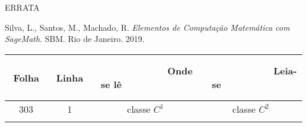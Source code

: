 \documentclass[12pt,a4paper]{report}
\begin{document}
\thispagestyle{empty}










\begin{center}
ERRATA 
\end{center}

\noindent
Silva, L., Santos, M., Machado, R. \textit{Elementos de Computação Matemática com SageMath}. SBM. Rio de Janeiro. 2019.



\vspace{1cm}

\centering
\setlength{\extrarowheight}{1.5pt}
\begin{tabular}{|c|c|c|c|}
\hline
 ~~ Folha ~~ & ~~ Linha ~~ & ~~~~~~~~~~~~ Onde se lê ~~~~~~~~~~~~ & ~~~~~~~~~~~~ Leia-se ~~~~~~~~~~~~ \\
\hline \hline
 303 & 1 & classe $C^1$  & classe $C^2$ \\ \hline
 & & & \\ \hline
\end{tabular}

% 
% 


% 
% 
% 
% 
% 
\end{document}
